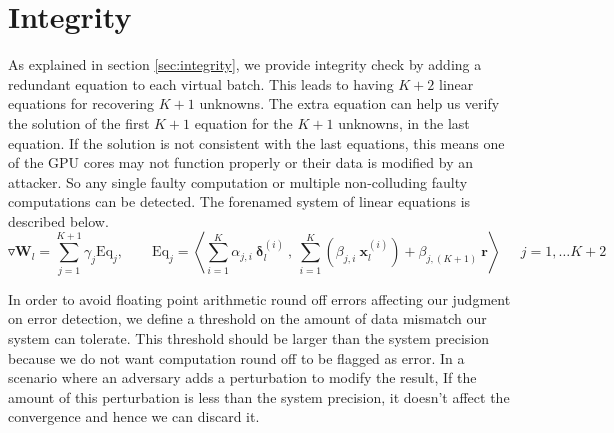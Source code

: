 \section{Integrity}
As explained in section \ref{sec:integrity}, we provide integrity check by adding a redundant equation to each virtual batch. This leads to having $K+2$ linear equations for recovering $K+1$ unknowns. The extra equation can help us verify the solution of the first $K+1$ equation for the $K+1$ unknowns, in the last equation. If the solution is not consistent with the last equations, this means one of the GPU cores may not function properly or their data is modified by an attacker. So any single faulty computation or multiple non-colluding faulty computations can be detected. The forenamed system of linear equations is described below. 
\begin{equation}\label{eq:gamma_lin2}
\triangledown \mathbf{W}_{l} = \sum_{j=1}^{K+1}  \gamma_{j} \text{Eq}_{j}, \qquad \text{Eq}_{j} = \left\langle \sum_{i=1}^K \alpha_{j,i}~ \mathbf \delta^{(i)}_{l}~,~ \sum_{i=1}^K (\beta_{j,i}~ \mathbf x^{(i)}_{l}) + \beta_{j,(K+1)} ~{\mathbf r} \right\rangle~\quad~j=1,\dots K+2
\end{equation}

In order to avoid floating point arithmetic round off errors affecting our judgment on error detection, we define a threshold on the amount of data mismatch our system can tolerate. This threshold should be larger than the system precision because we do not want computation round off to be flagged as error. In a scenario where an adversary adds a perturbation to modify the result, If the amount of this perturbation is less than the system precision, it doesn't affect the convergence and hence we can discard it. 